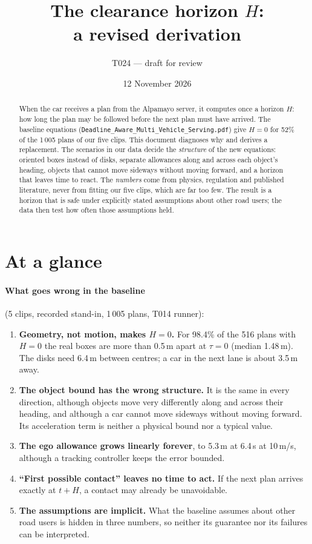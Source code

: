 \documentclass[11pt]{article}
\title{The clearance horizon $H$:\\[2pt] a revised derivation}
\author{T024 --- draft for review}
\date{12 November 2026}
\theoremstyle{definition}
\theoremstyle{remark}
\begin{document}
\maketitle

\begin{abstract}
When the car receives a plan from the Alpamayo server, it computes once a horizon $H$: how long the
plan may be followed before the next plan must have arrived. The baseline equations
(\texttt{Deadline\_Aware\_Multi\_Vehicle\_Serving.pdf}) give $H=0$ for 52\% of the 1\,005 plans of our
five clips. This document diagnoses why and derives a replacement. The scenarios in our data decide
the \emph{structure} of the new equations: oriented boxes instead of disks, separate allowances along and
across each object's heading, objects that cannot move sideways without moving forward, and a horizon
that leaves time to react. The \emph{numbers} come from physics, regulation and published literature,
never from fitting our five clips, which are far too few. The result is a horizon that is safe under
explicitly stated assumptions about other road users; the data then test how often those assumptions
held.
\end{abstract}

\tableofcontents

\section*{At a glance}

\paragraph{What goes wrong in the baseline} (5 clips, recorded stand-in, 1\,005 plans, T014 runner):
\begin{enumerate}[leftmargin=*]
  \item \textbf{Geometry, not motion, makes $H=0$.} For 98.4\% of the 516 plans with $H=0$ the real boxes
    are more than 0.5\,m apart at $\tau=0$ (median 1.48\,m). The disks need 6.4\,m between centres; a car in
    the next lane is about 3.5\,m away.
  \item \textbf{The object bound has the wrong structure.} It is the same in every direction, although
    objects move very differently along and across their heading, and although a car cannot move
    sideways without moving forward. Its acceleration term is neither a physical bound nor a typical value.
  \item \textbf{The ego allowance grows linearly forever}, to 5.3\,m at 6.4\,s at 10\,m/s, although a
    tracking controller keeps the error bounded.
  \item \textbf{``First possible contact'' leaves no time to act.} If the next plan arrives exactly at
    $t+H$, a contact may already be unavoidable.
  \item \textbf{The assumptions are implicit.} What the baseline assumes about other road users is hidden in
    three numbers, so neither its guarantee nor its failures can be interpreted.
\end{enumerate}
\end{document}
